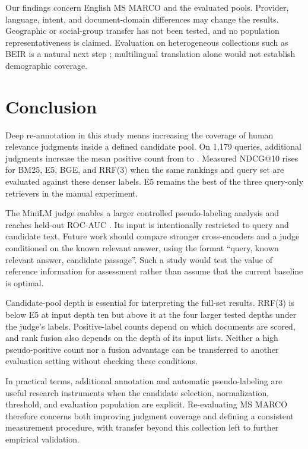 \documentclass[runningheads,a4paper]{llncs}
\begin{document}
Our findings concern English MS MARCO and the evaluated pools. Provider, language, intent, and document-domain differences may change the results. Geographic or social-group transfer has not been tested, and no population representativeness is claimed. Evaluation on heterogeneous collections such as BEIR is a natural next step \cite{thakur2021beir}; multilingual translation alone would not establish demographic coverage.

\section{Conclusion}
\label{sec:conclusion}

Deep re-annotation in this study means increasing the coverage of human relevance judgments inside a defined candidate pool. On 1,179 queries, additional judgments increase the mean positive count from \OriginalMeanRel{} to \HumanMeanRel{}. Measured NDCG@10 rises for BM25, E5, BGE, and RRF(3) when the same rankings and query set are evaluated against these denser labels. E5 remains the best of the three query-only retrievers in the manual experiment.

The MiniLM judge enables a larger controlled pseudo-labeling analysis and reaches held-out ROC-AUC \JudgeTestAuc{}. Its input is intentionally restricted to query and candidate text. Future work should compare stronger cross-encoders and a judge conditioned on the known relevant answer, using the format ``query, known relevant answer, candidate passage''. Such a study would test the value of reference information for assessment rather than assume that the current baseline is optimal.

Candidate-pool depth is essential for interpreting the full-set results. RRF(3) is below E5 at input depth ten but above it at the four larger tested depths under the judge's labels. Positive-label counts depend on which documents are scored, and rank fusion also depends on the depth of its input lists. Neither a high pseudo-positive count nor a fusion advantage can be transferred to another evaluation setting without checking these conditions.

In practical terms, additional annotation and automatic pseudo-labeling are useful research instruments when the candidate selection, normalization, threshold, and evaluation population are explicit. Re-evaluating MS MARCO therefore concerns both improving judgment coverage and defining a consistent measurement procedure, with transfer beyond this collection left to further empirical validation.


\clearpage

\end{document}
